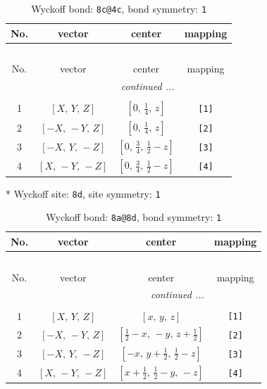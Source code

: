 \documentclass[fleqn,8pt]{jsarticle}
\begin{document}
\begin{longtable}{cccc}
\caption{Wyckoff bond: {\tt 8c@4c}, bond symmetry: {\tt 1}}
 \\
 \hline \hline
No. & vector & center & mapping \\ \hline \endfirsthead

\multicolumn{3}{l}{\tablename\ \thetable{}} \\
 \hline \hline
No. & vector & center & mapping \\ \hline \endhead

 \hline \hline
\multicolumn{3}{r}{\footnotesize\it continued ...} \\ \endfoot

 \hline \hline
\multicolumn{3}{r}{} \\ \endlastfoot

1 & $\left[ X,\, Y,\, Z \right]$ & $\left[ 0,\, \frac{1}{4},\, z \right]$ & {\tt [1]} \\ \hline
2 & $\left[ - X,\, - Y,\, Z \right]$ & $\left[ 0,\, \frac{1}{4},\, z \right]$ & {\tt [2]} \\ \hline
3 & $\left[ - X,\, Y,\, - Z \right]$ & $\left[ 0,\, \frac{3}{4},\, \frac{1}{2} - z \right]$ & {\tt [3]} \\ \hline
4 & $\left[ X,\, - Y,\, - Z \right]$ & $\left[ 0,\, \frac{3}{4},\, \frac{1}{2} - z \right]$ & {\tt [4]} \\
\end{longtable}
* Wyckoff site: {\tt 8d}, site symmetry: {\tt 1}
\renewcommand{\arraystretch}{1.2}
\begin{longtable}{cccc}
\caption{Wyckoff bond: {\tt 8a@8d}, bond symmetry: {\tt 1}}
 \\
 \hline \hline
No. & vector & center & mapping \\ \hline \endfirsthead

\multicolumn{3}{l}{\tablename\ \thetable{}} \\
 \hline \hline
No. & vector & center & mapping \\ \hline \endhead

 \hline \hline
\multicolumn{3}{r}{\footnotesize\it continued ...} \\ \endfoot

 \hline \hline
\multicolumn{3}{r}{} \\ \endlastfoot

1 & $\left[ X,\, Y,\, Z \right]$ & $\left[ x,\, y,\, z \right]$ & {\tt [1]} \\ \hline
2 & $\left[ - X,\, - Y,\, Z \right]$ & $\left[ \frac{1}{2} - x,\, - y,\, z + \frac{1}{2} \right]$ & {\tt [2]} \\ \hline
3 & $\left[ - X,\, Y,\, - Z \right]$ & $\left[ - x,\, y + \frac{1}{2},\, \frac{1}{2} - z \right]$ & {\tt [3]} \\ \hline
4 & $\left[ X,\, - Y,\, - Z \right]$ & $\left[ x + \frac{1}{2},\, \frac{1}{2} - y,\, - z \right]$ & {\tt [4]} \\
\end{longtable}
\end{document}
